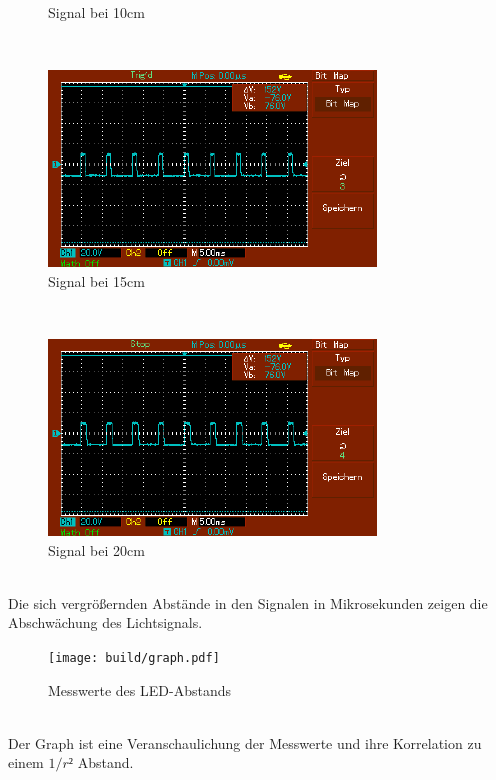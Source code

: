\documentclass[captions=tableheading]{scrartcl}
\begin{document}
\begin{itemize}
\begin{figure}
                \caption{Signal bei 10cm}
                \label{fig:10cmled}
            \end{figure}   
            \\
            \begin{figure}    
                \centering
                \includegraphics{Lock_In Bilder/Aufgabe 4/MAP003.pdf}
                \caption{Signal bei 15cm}
                \label{fig:15cmled}
            \end{figure}   
            \\
            \begin{figure} 
                \centering  
                \includegraphics{Lock_In Bilder/Aufgabe 4/MAP004.pdf}
                \caption{Signal bei 20cm}
                \label{fig:20cmled}    
            \end{figure}
            \\
        Die sich vergrößernden Abstände in den Signalen in Mikrosekunden zeigen die Abschwächung des Lichtsignals.
            \begin{figure}
                \centering
                \texttt{[image: build/graph.pdf]}
                \caption{Messwerte des LED-Abstands}
                \label{fig:graph}
            \end{figure}
        \\
        Der Graph ist eine Veranschaulichung der Messwerte und ihre Korrelation zu einem \(1/r²\) Abstand.
    \end{itemize}
\end{document}
